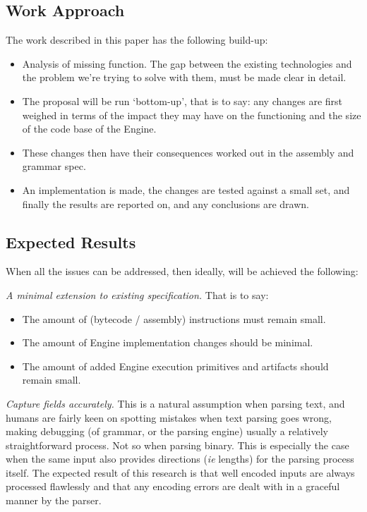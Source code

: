 \subsection{Work Approach}
The work described in this paper has the following build-up:

\begin{itemize}
    \item Analysis of missing function. The gap between the existing 
technologies and the problem we’re trying to solve with them, must be 
made clear in detail.
    \item The proposal will be run ‘bottom-up’, that is to say: any 
changes are first weighed in terms of the impact they may have on the 
functioning and the size of the code base of the Engine.
    \item These changes then have their consequences worked out in the 
assembly and grammar spec.
    \item An implementation is made, the changes are tested against a small 
set, and finally the results are reported on, and any conclusions are 
drawn.
\end{itemize}

\subsection{Expected Results}
When all the issues can be addressed, then ideally, will be achieved the 
following:

\textit{A minimal extension to existing specification.} That is to say:
\begin{itemize}
    \item The amount of (bytecode / assembly) instructions must remain small.
    \item The amount of Engine implementation changes should be minimal.
    \item The amount of added Engine execution primitives and artifacts 
should remain small.
\end{itemize}

\textit{Capture fields accurately.}
This is a natural assumption when parsing text, and humans are fairly keen
on spotting mistakes when text parsing goes wrong, making debugging
(of grammar, or the parsing engine) usually a relatively straightforward
process. Not so when parsing binary. This is especially the case when the same
input also provides directions (\textit{ie} lengths) for the parsing
process itself. The expected result of this research is that well encoded
inputs are always processed flawlessly and
that any encoding errors are dealt with in
a graceful manner by the parser.

